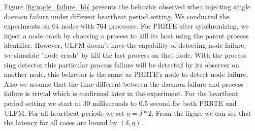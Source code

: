 \documentclass[sigconf]{acmart}
\newcommand{\prrte}[0]{\textsc{PRRTE}\xspace}
\newcommand{\ulfm}[0]{\textsc{ULFM}\xspace}
\begin{document}
Figure \ref{fig:node_failure_hb} presents the behavior observed when injecting single daemon failure under different heartbeat period setting. We conducted the experiments on 64 nodes with 764 processes. For \prrte after synchronizing, we inject a node crash by choosing a process to kill its host using the parent process identifier. However, \ulfm doesn't have the capability of detecting node failure, we simulate "node crash" by kill the last process on that node. With the process ring detector this particular process failure will be detected by its observer on another node, this behavior is the same as \prrte's node to detect node failure. Also we assume that the time different between the daemon failure and process failure is trivial which is confirmed later in the experiment. For the heartbeat period setting we start at 30 milliseconds to 0.5 second for both \prrte and \ulfm. For all heartbeat periods we set $ \eta = \delta * 2 $. From the figure we can see that the latency for all cases are bound by $ (\delta,\eta) $.
\end{document}
